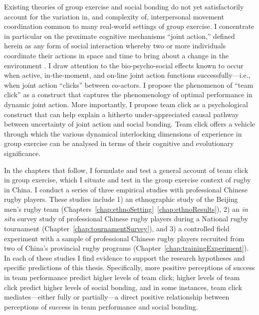 \begin{CJK}{UTF8}{gbsn}
Existing theories of group exercise and social bonding do not yet satisfactorily account for the variation in, and complexity of, interpersonal movement coordination common to many real-world settings of group exercise.  I concentrate in particular on the proximate cognitive mechanisms  ``joint action,'' defined herein as any form of social interaction whereby two or more individuals coordinate their actions in space and time to bring about a change in the environment \citep{Sebanz2006}.  I draw attention to the bio-psycho-social effects known to occur when active, in-the-moment, and on-line joint action functions successfully---i.e., when joint action ``clicks'' between co-actors.  I propose the phenomenon of ``team click'' as a construct that captures the phenomenology of optimal performance in dynamic joint action.  More importantly, I propose team click as a psychological construct that can help explain a hitherto under-appreciated causal pathway between uncertainty of joint action and social bonding.  Team click offers a vehicle through which the various dynamical interlocking dimensions of experience in group exercise can be analysed in terms of their cognitive and evolutionary significance.


In the chapters that follow, I formulate and test a general account of team click in group exercise, which I situate and test in the group exercise context of rugby in China.  I conduct a series of three empirical studies with professional Chinese rugby players.  These studies include 1) an ethnographic study of the Beijing men's rugby team (Chapters~\ref{chap:ethnoSetting}\nobreakdash~\ref{chap:ethnoResults}), 2) an \textit{in situ} survey study of professional Chinese rugby players during a National rugby tournament (Chapter~\ref{chap:tournamentSurvey}), and 3) a controlled field experiment with a sample of professional Chinese rugby players recruited from two of China's provincial rugby programs (Chapter~\ref{chap:trainingExperiment}).  In each of these studies I find evidence to support the research hypotheses and specific predictions of this thesis.  Specifically, more positive perceptions of success in team performance predict higher levels of team click; higher levels of team click predict higher levels of social bonding, and in some instances, team click mediates---either fully or partially---a direct positive relationship between perceptions of success in team performance and social bonding.


\end{CJK}
